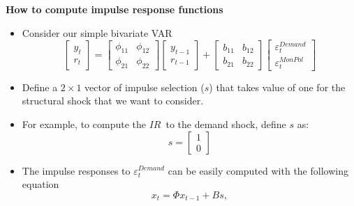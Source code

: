 \documentclass[10pt,english,t,aspectratio=169,ignorenonframetext]{beamer}
\begin{document}
\begin{frame}
{\textbf{How to compute {impulse response functions}}}\bigskip

\begin{itemize}
\item Consider our simple bivariate VAR%
\begin{equation*}
\left[ 
\begin{array}{c}
y_{t} \\ 
r_{t}%
\end{array}%
\right] =%
\begin{bmatrix}
\phi _{11} & \phi _{12} \\ 
\phi _{21} & \phi _{22}%
\end{bmatrix}%
\left[ 
\begin{array}{c}
y_{t-1} \\ 
r_{t-1}%
\end{array}%
\right] +\left[ 
\begin{array}{cc}
b_{11} & b_{12} \\ 
b_{21} & b_{22}%
\end{array}%
\right] 
\begin{bmatrix}
\varepsilon _{t}^{Demand} \\ 
\varepsilon _{t}^{MonPol}%
\end{bmatrix}%
\end{equation*}

\item Define a $2\times 1$ vector of impulse selection ($s$) that takes
value of one for the structural shock that we want to consider.\bigskip

\item For example, to compute the $IR$\ to the demand shock, define $s$ as:%
\begin{equation*}
s=\left[ 
\begin{array}{c}
1 \\ 
0%
\end{array}%
\right]
\end{equation*}

\item The impulse responses to $\varepsilon _{t}^{Demand}$ can be easily
computed with the following equation%
\begin{equation*}
x_{t}=\Phi x_{t-1}+Bs,
\end{equation*}
\end{itemize}
\end{frame}

\end{document}

